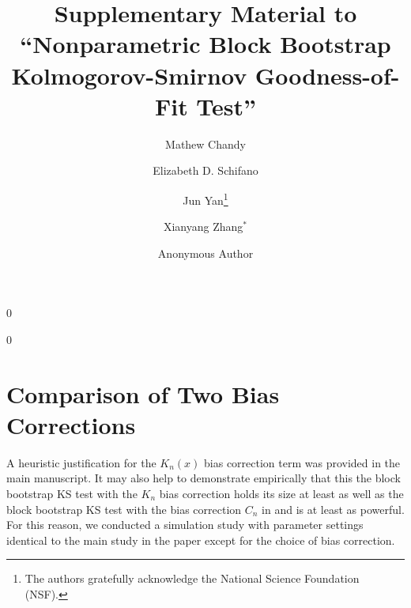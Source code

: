 \documentclass[12pt]{article}
\newcommand{\blind}{0}
\begin{document}
%

\def\spacingset#1{\renewcommand{\baselinestretch}%
{#1}\small\normalsize} \spacingset{1}



\title{\bf Supplementary Material to\\
  ``Nonparametric Block Bootstrap Kolmogorov-Smirnov Goodness-of-Fit Test''
}
\blind
{
  \author[1,2]{Mathew Chandy}
  \author[1]{Elizabeth D. Schifano}
  \author[1]{Jun Yan\thanks{
    The authors gratefully acknowledge the National Science Foundation (NSF).}\hspace{.2cm}}
  \author[3]{Xianyang Zhang$^{\ast}$ }
  \maketitle
} \fi

\blind
{
  \bigskip
  \bigskip
  \bigskip
  \author{Anonymous Author}
} \fi

\maketitle

\section{Comparison of Two Bias Corrections}

A heuristic justification for the $K_n(x)$ bias correction term was
provided in the main manuscript. It may also help to demonstrate
empirically that this the block bootstrap KS test with the $K_n$ bias
correction holds its size at least as well as the block bootstrap KS
test with the bias correction $C_n$ in \citet{babu2004goodness} and is
at least as powerful. For this reason, we conducted a simulation study
with parameter settings identical to the main study in the paper
except for the choice of bias correction.
\end{document}
